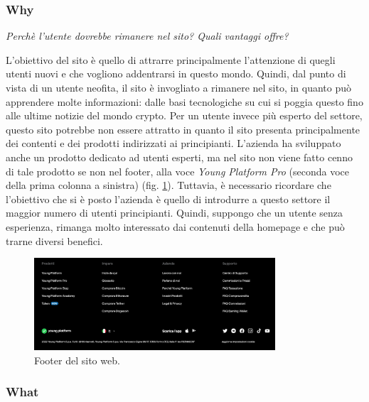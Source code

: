 \subsubsection{Why}

\centerline{\textit{Perchè l'utente dovrebbe rimanere 
nel sito? Quali vantaggi offre?}}
L'obiettivo del sito è quello di attrarre principalmente l'attenzione di 
quegli utenti nuovi e che vogliono addentrarsi in questo mondo. Quindi, 
dal punto di vista di un utente neofita, il sito è invogliato a rimanere 
nel sito, in quanto può apprendere molte informazioni: dalle basi 
tecnologiche su cui si poggia questo fino alle ultime notizie del mondo 
crypto. Per un utente invece più esperto del settore, questo sito potrebbe 
non essere attratto in quanto il sito presenta principalmente dei contenti 
e dei prodotti indirizzati ai principianti. L'azienda ha sviluppato anche 
un prodotto dedicato ad utenti esperti, ma nel sito non viene fatto cenno 
di tale prodotto se non nel footer, alla voce \textit{Young Platform Pro} 
(seconda voce della prima colonna a sinistra) (fig. \ref{fig:footer}). 
Tuttavia, è necessario ricordare che l'obiettivo che si è posto l'azienda 
è quello di introdurre a questo settore il maggior numero di utenti 
principianti. Quindi, suppongo che un utente senza esperienza, rimanga 
molto interessato dai contenuti della homepage e che può trarne diversi 
benefici.

\begin{figure}[H]
	\centering
	\includegraphics[width=0.80\textwidth]{res/images/footer.png}
	\caption{Footer del sito web.}
	\label{fig:footer}
\end{figure}

\subsubsection{What}

